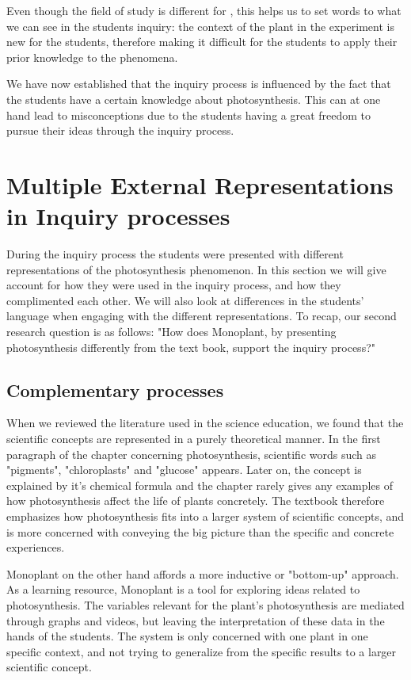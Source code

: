 Even though the field of study is different for \citeauthor{klahr1993heuristics}, this helps us to set words to what we can see in the students inquiry: the context of the plant in the experiment is new for the students, therefore making it difficult for the students to apply their prior knowledge to the phenomena. 

We have now established that the inquiry process is influenced by the fact that the students have a certain knowledge about photosynthesis. This can at one hand lead to misconceptions due to the students having a great freedom to pursue their ideas through the inquiry process. 







\section{Multiple External Representations in Inquiry processes}
During the inquiry process the students were presented with different representations of the photosynthesis phenomenon. In this section we will give account for how they were used in the inquiry process, and how they complimented each other. We will also look at differences in the students' language when engaging with the different representations. To recap, our second research question is as follows: "How does Monoplant, by presenting photosynthesis differently from the text book, support the inquiry process?"

\subsection{Complementary processes}
When we reviewed the literature used in the science education, we found that the scientific concepts are represented in a purely theoretical manner. In the first paragraph of the chapter concerning photosynthesis, scientific words such as "pigments", "chloroplasts" and "glucose" appears. Later on, the concept is explained by it's chemical formula and the chapter rarely gives any examples of how photosynthesis affect the life of plants concretely. The textbook therefore emphasizes how photosynthesis fits into a larger system of scientific concepts, and is more concerned with conveying the big picture than the specific and concrete experiences. 

Monoplant on the other hand affords a more inductive or "bottom-up" approach. As a learning resource, Monoplant is a tool for exploring ideas related to photosynthesis. The variables relevant for the plant's photosynthesis are mediated through graphs and videos, but leaving the interpretation of these data in the hands of the students. The system is only concerned with one plant in one specific context, and not trying to generalize from the specific results to a larger scientific concept. 

